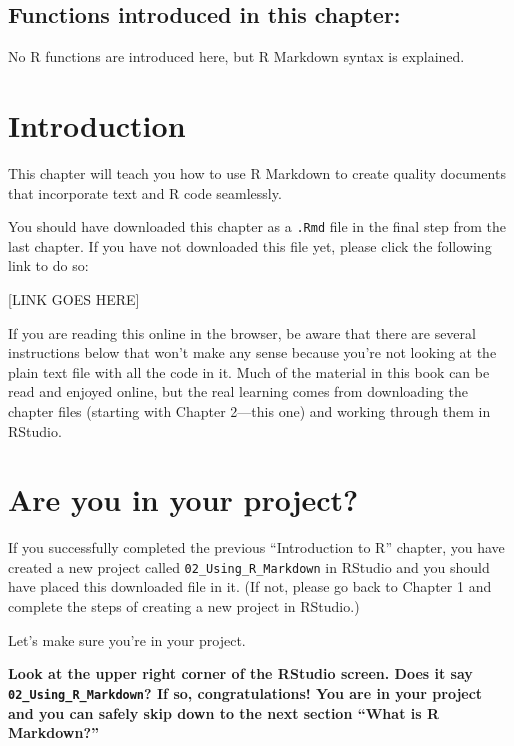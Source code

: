 \documentclass[
]{book}
\begin{document}
\hypertarget{functions-introduced-in-this-chapter-1}{%
\subsection*{Functions introduced in this chapter:}\label{functions-introduced-in-this-chapter-1}}

No R functions are introduced here, but R Markdown syntax is explained.

\hypertarget{rmark-intro}{%
\section{Introduction}\label{rmark-intro}}

This chapter will teach you how to use R Markdown to create quality documents that incorporate text and R code seamlessly.

You should have downloaded this chapter as a \texttt{.Rmd} file in the final step from the last chapter. If you have not downloaded this file yet, please click the following link to do so:

{[}LINK GOES HERE{]}

If you are reading this online in the browser, be aware that there are several instructions below that won't make any sense because you're not looking at the plain text file with all the code in it. Much of the material in this book can be read and enjoyed online, but the real learning comes from downloading the chapter files (starting with Chapter 2---this one) and working through them in RStudio.

\hypertarget{rmark-project}{%
\section{Are you in your project?}\label{rmark-project}}

If you successfully completed the previous ``Introduction to R'' chapter, you have created a new project called \texttt{02\_Using\_R\_Markdown} in RStudio and you should have placed this downloaded file in it. (If not, please go back to Chapter 1 and complete the steps of creating a new project in RStudio.)

Let's make sure you're in your project.

\textbf{Look at the upper right corner of the RStudio screen. Does it say \texttt{02\_Using\_R\_Markdown}? If so, congratulations! You are in your project and you can safely skip down to the next section ``What is R Markdown?''}
\end{document}
